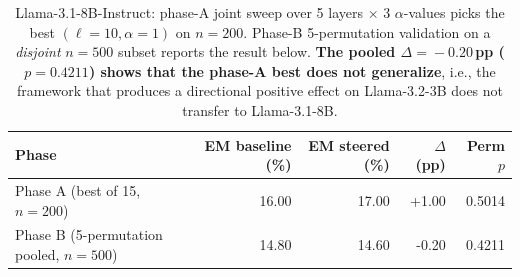 \begin{table}[htbp]
\caption{Llama-3.1-8B-Instruct: phase-A joint sweep over 5 layers $\times$ 3 $\alpha$-values picks the best $(\ell\!=\!10, \alpha\!=\!1)$ on $n\!=\!200$. Phase-B 5-permutation validation on a \emph{disjoint} $n\!=\!500$ subset reports the result below. \textbf{The pooled $\Delta\!=\!-0.20$\,pp ($p\!=\!0.4211$) shows that the phase-A best does not generalize}, i.e., the framework that produces a directional positive effect on Llama-3.2-3B does not transfer to Llama-3.1-8B.}
\label{tab:llama8b}
\centering\renewcommand{\arraystretch}{1.15}
\begin{tabular}{l r r r r}
\toprule
Phase & EM baseline (\%) & EM steered (\%) & $\Delta$ (pp) & Perm $p$ \\
\midrule
Phase A (best of 15, $n\!=\!200$) & 16.00 & 17.00 & +1.00 & 0.5014 \\
Phase B (5-permutation pooled, $n\!=\!500$) & 14.80 & 14.60 & -0.20 & 0.4211 \\
\bottomrule\end{tabular}\end{table}
